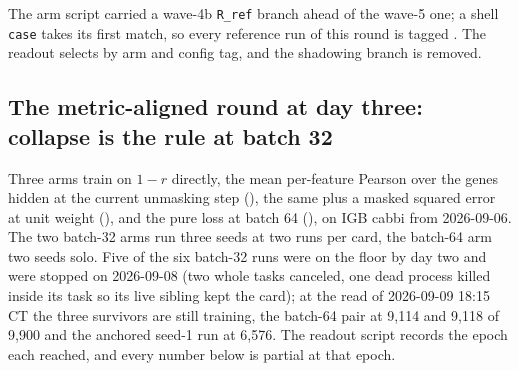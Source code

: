  The arm script carried a wave-4b
\texttt{R\_ref} branch ahead of the wave-5 one; a shell \texttt{case} takes its first
match, so every reference run of this round is tagged . The readout
selects by arm and config tag, and the shadowing branch is removed.

\subsection{The metric-aligned round at day three: collapse is the rule at batch 32
}
\label{sec:readouts-pearson}

Three arms train on $1 - r$ directly, the mean per-feature Pearson over the genes hidden at
the current unmasking step (), the same plus a masked squared error at unit
weight (), and the pure loss at batch 64 (), on IGB cabbi
from 2026-09-06. The two batch-32 arms run three seeds at two runs per card, the batch-64
arm two seeds solo. Five of the six batch-32 runs were on the floor by day two and were
stopped on 2026-09-08 (two whole tasks canceled, one dead process killed inside its task
so its live sibling kept the card); at the read of 2026-09-09 18:15 CT the three
survivors are still training, the batch-64 pair at 9{,}114 and 9{,}118 of 9{,}900 and the
anchored seed-1 run at 6{,}576. The readout script records the epoch each reached, and
every number below is partial at that epoch.

